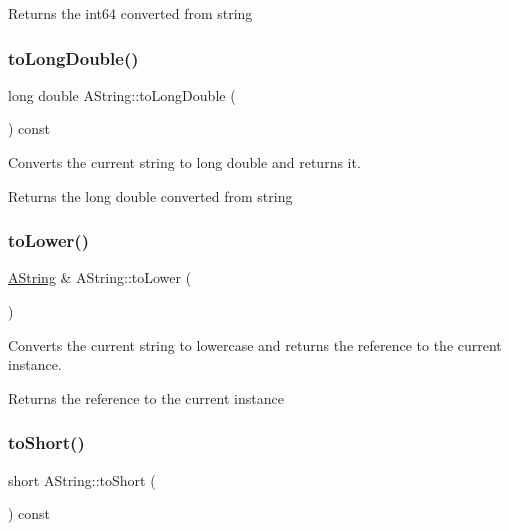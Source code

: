 \begin{DoxyReturn}{Returns}
the int64 converted from string 
\end{DoxyReturn}
\mbox{\label{class_a_string_a7ce9b9dd2163dac80a4a80e5cb81878a}} 
\subsubsection{\texorpdfstring{toLongDouble()}{toLongDouble()}}
{\footnotesize\ttfamily long double A\+String\+::to\+Long\+Double (\begin{DoxyParamCaption}{ }\end{DoxyParamCaption}) const}



Converts the current string to long double and returns it. 

\begin{DoxyReturn}{Returns}
the long double converted from string 
\end{DoxyReturn}
\mbox{\label{class_a_string_aade3f9bf7dfe337df49f7f094068379e}} 
\subsubsection{\texorpdfstring{toLower()}{toLower()}}
{\footnotesize\ttfamily \mbox{\hyperlink{class_a_string}{A\+String}} \& A\+String\+::to\+Lower (\begin{DoxyParamCaption}{ }\end{DoxyParamCaption})}



Converts the current string to lowercase and returns the reference to the current instance. 

\begin{DoxyReturn}{Returns}
the reference to the current instance 
\end{DoxyReturn}
\mbox{\label{class_a_string_a57ad542374eaadedfd9bcc4789887d79}} 
\subsubsection{\texorpdfstring{toShort()}{toShort()}}
{\footnotesize\ttfamily short A\+String\+::to\+Short (\begin{DoxyParamCaption}{ }\end{DoxyParamCaption}) const}



